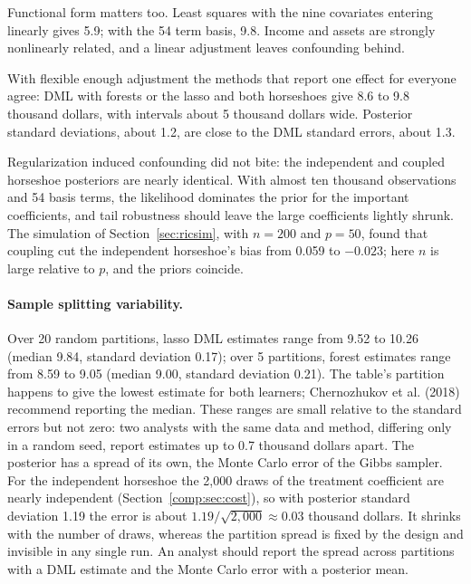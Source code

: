 Functional form matters too. Least squares with the nine covariates entering linearly gives 5.9; with the 54 term basis, 9.8. Income and assets are strongly nonlinearly related, and a linear adjustment leaves confounding behind.

With flexible enough adjustment the methods that report one effect for everyone agree: DML with forests or the lasso and both horseshoes give 8.6 to 9.8 thousand dollars, with intervals about 5 thousand dollars wide. Posterior standard deviations, about 1.2, are close to the DML standard errors, about 1.3.

Regularization induced confounding did not bite: the independent and coupled horseshoe posteriors are nearly identical. With almost ten thousand observations and 54 basis terms, the likelihood dominates the prior for the important coefficients, and tail robustness should leave the large coefficients lightly shrunk. The simulation of Section~\ref{sec:ricsim}, with $n = 200$ and $p = 50$, found that coupling cut the independent horseshoe's bias from 0.059 to $-0.023$; here $n$ is large relative to $p$, and the priors coincide. 

\paragraph{Sample splitting variability.} Over 20 random partitions, lasso DML estimates range from 9.52 to 10.26 (median 9.84, standard deviation 0.17); over 5 partitions, forest estimates range from 8.59 to 9.05 (median 9.00, standard deviation 0.21). The table's partition happens to give the lowest estimate for both learners; Chernozhukov et al. (2018) recommend reporting the median. These ranges are small relative to the standard errors but not zero: two analysts with the same data and method, differing only in a random seed, report estimates up to 0.7 thousand dollars apart. The posterior has a spread of its own, the Monte Carlo error of the Gibbs sampler. For the independent horseshoe the 2,000 draws of the treatment coefficient are nearly independent (Section~\ref{comp:sec:cost}), so with posterior standard deviation 1.19 the error is about $1.19/\sqrt{2{,}000} \approx 0.03$ thousand dollars. It shrinks with the number of draws, whereas the partition spread is fixed by the design and invisible in any single run. An analyst should report the spread across partitions with a DML estimate and the Monte Carlo error with a posterior mean.

